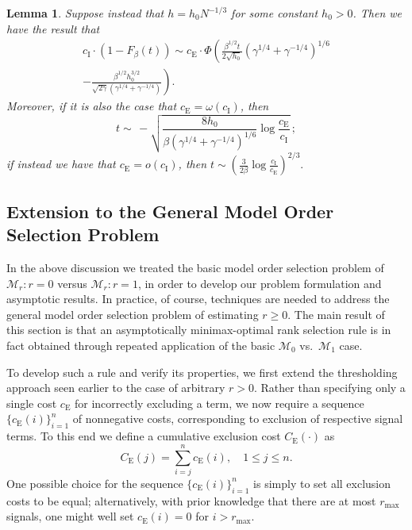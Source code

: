 \documentclass[final]{IEEEtran}
\newtheorem{lemma}{Lemma}
\newcommand{\ce}{c_\text{E}}
\newcommand{\Ce}{C_\text{E}}
\newcommand{\ci}{c_\text{I}}
\begin{document}
\begin{lemma}\label{L:thresh-med-h}
    Suppose instead that $h = h_0 N^{-1/3}$ for some constant $h_0 > 0$.  Then we have the result that
    \begin{multline*}
        \ci
        \cdot
        (1 - F_\beta ( t ) )
        \sim
        \ce
        \cdot
        \Phi \!\left(
            \frac{\beta^{1/2} t}{ 2 \sqrt{ h_0 }}
            \left( \gamma^{1/4} + \gamma^{-1/4} \right)^{1/6} \right.
            \\
            -
            \left.
            \frac{ \beta^{1/2} h_0^{3/2} }
                 { \sqrt{ 2 \gamma }
                   \left( \gamma^{1/4} + \gamma^{-1/4} \right) }
        \right).
    \end{multline*}
    Moreover, if it is also the case that $\ce = \omega( \ci )$, then
    \[
        t
        \sim
        \,-
        \sqrt{
            \frac{ 8 h_0 }{ \beta (\gamma^{1/4} + \gamma^{-1/4} )^{1/6} }
            \log \frac{\ce}{\ci}
        } \,;
    \]
    if instead we have that $\ce = o( \ci )$, then
    $
        t
        \sim
        \left(
            \frac{3}{2 \beta}
            \log \frac{\ci}{\ce}
        \right)^{2/3}.
    $
\end{lemma}



\subsection{Extension to the General Model Order Selection Problem}

In the above discussion we treated the basic model order selection problem of $\mathcal{M}_r: r = 0$ versus $\mathcal{M}_r: r = 1$, in order to develop our problem formulation and asymptotic results.  In practice, of course, techniques are needed to address the general model order selection problem of estimating $r \geq 0$.  The main result of this section is that an asymptotically minimax-optimal rank selection rule is in fact obtained through repeated application of the basic $\mathcal{M}_0$ vs.~$\mathcal{M}_1$ case.

To develop such a rule and verify its properties, we first extend the thresholding approach seen earlier to the case of arbitrary $r > 0$.  Rather than specifying only a single cost $\ce$ for incorrectly excluding a term, we now require a sequence $\{\ce(i)\}_{i=1}^n$  of nonnegative costs, corresponding to exclusion of respective signal terms.  To this end we define a cumulative exclusion cost $\Ce(\cdot)$ as
\begin{equation}\label{E:Ce}
    \Ce(j) = \sum_{i=j}^n \ce(i), \quad 1 \leq j \leq n \text{.}
\end{equation}
One possible choice for the sequence $\{\ce(i)\}_{i=1}^n$ is simply to set all exclusion costs to be equal; alternatively, with prior knowledge that there are at most $r_\text{max}$ signals, one might well set $\ce(i) = 0$ for
$i > r_\text{max}$.
\end{document}
